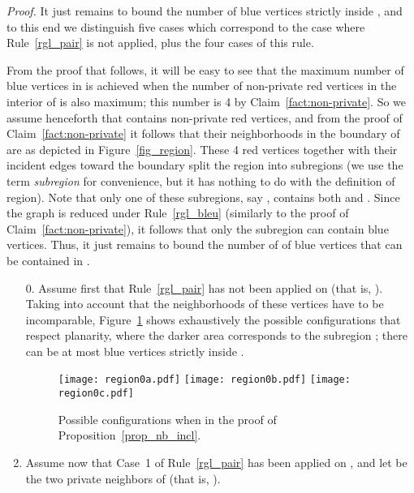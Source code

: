 \documentclass[a4paper,11pt]{article}
\newcommand{\rrgl}   [1] {Rule~\ref{#1}\xspace}
\newenvironment{proof}{\noindent \textit{Proof. }}{\hfill\vspace{.2cm}}
\begin{document}
\begin{proof}
It just remains to bound the number of blue vertices strictly inside , and to this end we  distinguish five cases which correspond to the case where \rrgl{rgl_pair} is not applied, plus the four cases of this rule.



From the proof that follows, it will be easy to see that  the maximum number of blue vertices in  is achieved when the number of non-private red vertices in the interior of  is also maximum; this number is 4 by Claim~\ref{fact:non-private}. So we assume henceforth that  contains  non-private red vertices, and from the proof of Claim~\ref{fact:non-private} it follows that their neighborhoods in the boundary of  are as depicted in Figure~\ref{fig_region}.   These 4 red vertices together with their incident edges toward the boundary split the region  into  subregions (we use the term \emph{subregion} for convenience, but it has nothing to do with the definition of region). Note that only one of these subregions, say , contains both  and . Since the graph is reduced under Rule~\ref{rgl_bleu} (similarly to the proof of Claim~\ref{fact:non-private}), it follows that only the subregion  can contain blue vertices. Thus, it just remains to bound the number of of blue vertices that can be contained in .
\begin{enumerate}
\item [0.]
Assume first that \rrgl{rgl_pair} has not been applied on   (that is, ).
Taking into account that the neighborhoods of these vertices have to be incomparable, Figure~\ref{fig_region-NEW} shows exhaustively the possible configurations that respect planarity, where the darker area corresponds to the subregion ; there can be at most  blue vertices strictly inside .

    \begin{figure}[h!tb]
\begin{center}
   \texttt{[image: region0a.pdf]}
   \texttt{[image: region0b.pdf]}
   \texttt{[image: region0c.pdf]}
\end{center}
\vspace{-.4cm}
   \caption{Possible configurations when  in the proof of Proposition~\ref{prop_nb_incl}.}
   \label{fig_region-NEW}
\end{figure}

\item
Assume now that Case~1 of \rrgl{rgl_pair} has been applied on , and let  be the two private neighbors of  (that is, ).\\



\end{enumerate}
\end{proof}
\end{document}
